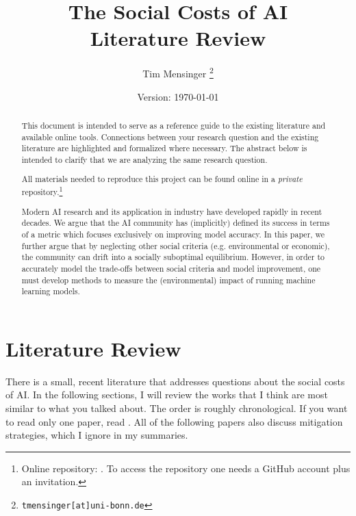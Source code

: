 \documentclass[a4paper, 12pt]{article}
\title{\textbf{The Social Costs of AI}\\
    \Large Literature Review
}
\date{Version: \today}
\author{Tim Mensinger%
  \thanks{\texttt{tmensinger[at]uni-bonn.de}}
}
\affil{Bonn Graduate School of Economics}
\begin{document}
\onehalfspacing


\maketitle

\renewcommand{\abstractname}{Preamble}
\begin{abstract}
    \noindent This document is intended to serve as a reference guide to the existing
    literature and available online tools. Connections between your research question
    and the existing literature are highlighted and formalized where necessary. The
    abstract below is intended to clarify that we are analyzing the same research
    question.

    All materials needed to reproduce this project can be found online in a
    \emph{private} repository.\footnote{Online repository:
    . To access the repository one
    needs a GitHub account plus an invitation.}
\end{abstract}

\renewcommand{\abstractname}{Abstract}
\begin{abstract}
    \noindent Modern AI research and its application in industry have developed rapidly
    in recent decades. We argue that the AI community has (implicitly) defined its
    success in terms of a metric which focuses exclusively on improving model accuracy.
    In this paper, we further argue that by neglecting other social criteria (e.g.
    environmental or economic), the community can drift into a socially suboptimal
    equilibrium. However, in order to accurately model the trade-offs between social
    criteria and model improvement, one must develop methods to measure the
    (environmental) impact of running machine learning models.
\end{abstract}
\thispagestyle{empty}

\newpage



\section{Literature Review}

There is a small, recent literature that addresses questions about the social costs of
AI. In the following sections, I will review the works that I think are most similar to
what you talked about. The order is roughly chronological. If you want to read only one
paper, read . All of the following papers also discuss mitigation
strategies, which I ignore in my summaries.
\end{document}
